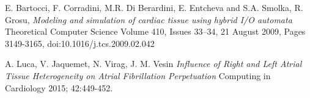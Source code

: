 \documentclass[twocolumn, a1paper]{article}
\begin{document}
\begin{thebibliography}{7}
E. Bartocci, F. Corradini, M.R. Di Berardini, E. Entcheva and S.A. Smolka, R. Grosu, 
\emph{Modeling and simulation of cardiac tissue using hybrid I/O automata}
Theoretical Computer Science
Volume 410, Issues 33–34, 21 August 2009, Pages 3149-3165,
doi:10.1016/j.tcs.2009.02.042


A. Luca, V. Jaquemet, N. Virag, J. M. Vesin
\emph{Influence of Right and Left Atrial Tissue Heterogeneity on
Atrial Fibrillation Perpetuation }
Computing in Cardiology 2015; 42:449-452. 



\end{thebibliography}
\end{document}
